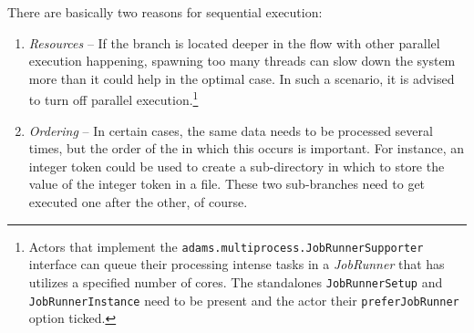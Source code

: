 There are basically two reasons for sequential execution:
\begin{enumerate}
  \item \textit{Resources} -- If the branch is located deeper in the flow with
  other parallel execution happening, spawning too many threads can slow down
  the system more than it could help in the optimal case. In such a scenario, it
  is advised to turn off parallel execution.\footnote{Actors that implement the
  \texttt{adams.multiprocess.JobRunnerSupporter} interface can queue their
  processing intense tasks in a \textit{JobRunner} that has utilizes a specified
  number of cores. The standalones \texttt{JobRunnerSetup} and \texttt{JobRunnerInstance}
  need to be present and the actor their \texttt{preferJobRunner} option ticked.}
  \item \textit{Ordering} -- In certain cases, the same data needs to be
  processed several times, but the order of the in which this occurs is
  important. For instance, an integer token could be used to create a
  sub-directory in which to store the value of the integer token in a file.
  These two sub-branches need to get executed one after the other, of course.
\end{enumerate}



